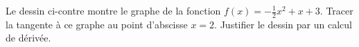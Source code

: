 
\begin{exercice}\label{exosmath-0405}


\begin{minipage}{0.485\textwidth}
    Le dessin ci-contre montre le graphe de la fonction \( f(x)=-\frac{ 1 }{ 2 }x^2+x+3\). Tracer la tangente à ce graphe au point d'abscisse \( x=2\).  Justifier le dessin par un calcul de dérivée.
                    \end{minipage}
                    \hspace{1mm}    
                    \begin{minipage}{0.485\textwidth}
                            \begin{center}
                            
                            \end{center}
                    \end{minipage}

\end{exercice}
